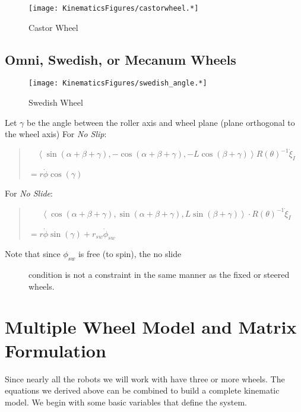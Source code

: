 \begin{figure}
\centering
\texttt{[image: KinematicsFigures/castorwheel.*]}
\caption{Castor Wheel}
\end{figure}

\hypertarget{omni-swedish-or-mecanum-wheels}{%
\subsection{Omni, Swedish, or Mecanum
Wheels}\label{omni-swedish-or-mecanum-wheels}}

\begin{figure}
\centering
\texttt{[image: KinematicsFigures/swedish\_angle.*]}
\caption{Swedish Wheel}
\end{figure}

Let \(\gamma\) be the angle between the roller axis and wheel plane
(plane orthogonal to the wheel axis) For \emph{No Slip}:

\begin{quote}
\[\left\langle \sin(\alpha+\beta+\gamma) , -\cos(\alpha+\beta+\gamma), -L\cos(\beta +\gamma) \right\rangle
R(\theta)^{-1}\dot{\xi}_I\]

\(= r\dot{\phi}\cos(\gamma)\)
\end{quote}

For \emph{No Slide}:

\begin{quote}
\[\left\langle \cos(\alpha+\beta +\gamma) , \sin(\alpha+\beta+\gamma),  L\sin(\beta + \gamma) \right\rangle
\cdot R(\theta)^{-1}\dot{\xi}_I\]

\(= r\dot{\phi}\sin(\gamma) + r_{sw}\dot{\phi}_{sw}\)
\end{quote}

\begin{description}
\item[Note that since \(\phi_{sw}\) is free (to spin), the no slide]
condition is not a constraint in the same manner as the fixed or steered
wheels.
\end{description}

\hypertarget{multiple-wheel-model-and-matrix-formulation}{%
\section{Multiple Wheel Model and Matrix
Formulation}\label{multiple-wheel-model-and-matrix-formulation}}

Since nearly all the robots we will work with have three or more wheels.
The equations we derived above can be combined to build a complete
kinematic model. We begin with some basic variables that define the
system.

